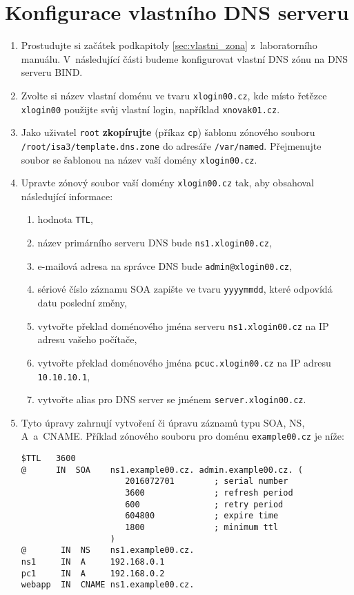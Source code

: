 \documentclass[a4paper,11pt]{article}
\begin{document}
\section{Konfigurace vlastního DNS serveru}
\begin{enumerate}
  \item Prostudujte si začátek podkapitoly \ref{sec:vlastni_zona} z~laboratorního manuálu. V~následující části budeme konfigurovat vlastní DNS zónu na DNS serveru BIND.
  \item Zvolte si název vlastní doménu ve tvaru {\tt xlogin00.cz}, kde místo řetězce {\tt xlogin00} použijte svůj vlastní login, například {\tt xnovak01.cz}.

  \item Jako uživatel {\tt root} \textbf{zkopírujte} (příkaz \texttt{cp}) šablonu zónového souboru {\tt /root/isa3/template.dns.zone} do adresáře {\tt /var/named}. Přejmenujte soubor se šablonou na název vaší domény {\tt xlogin00.cz}.
  \item Upravte zónový soubor vaší domény {\tt xlogin00.cz} tak, aby obsahoval následující informace:
    \begin{enumerate}
      \item hodnota \texttt{TTL},
      \item název primárního serveru DNS bude  {\tt ns1.xlogin00.cz},
      \item e-mailová adresa na správce DNS bude {\tt admin@xlogin00.cz},
      \item sériové číslo záznamu SOA zapište ve tvaru {\tt yyyymmdd}, které odpovídá datu poslední změny,
      \item vytvořte překlad doménového jména serveru {\tt ns1.xlogin00.cz} na IP adresu vašeho počítače,
      \item vytvořte překlad doménového jména {\tt pcuc.xlogin00.cz} na IP adresu {\tt 10.10.10.1},
      \item vytvořte alias pro DNS server se jménem {\tt server.xlogin00.cz}.
    \end{enumerate}
  \item Tyto úpravy zahrnují vytvoření či úpravu záznamů typu SOA, NS, A~a~CNAME. Příklad zónového souboru pro doménu {\tt example00.cz} je níže:
\begin{verbatim}
$TTL   3600
@      IN  SOA    ns1.example00.cz. admin.example00.cz. (
                     2016072701        ; serial number
                     3600              ; refresh period
                     600               ; retry period
                     604800            ; expire time
                     1800              ; minimum ttl
                  )
@       IN  NS    ns1.example00.cz.
ns1     IN  A     192.168.0.1
pc1     IN  A     192.168.0.2
webapp  IN  CNAME ns1.example00.cz.
\end{verbatim}


\end{enumerate}
\end{document}
